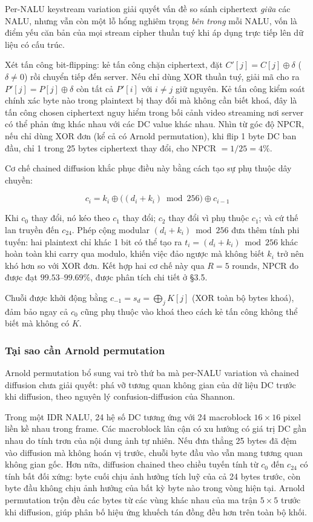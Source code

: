 Per-NALU keystream variation giải quyết vấn đề so sánh ciphertext \emph{giữa} các NALU, nhưng vẫn còn một lỗ hổng nghiêm trọng \emph{bên trong} mỗi NALU, vốn là điểm yếu căn bản của mọi stream cipher thuần tuý khi áp dụng trực tiếp lên dữ liệu có cấu trúc.

Xét tấn công bit-flipping: kẻ tấn công chặn ciphertext, đặt $C'[j] = C[j] \oplus \delta$ ($\delta \neq 0$) rồi chuyển tiếp đến server. Nếu chỉ dùng XOR thuần tuý, giải mã cho ra $P'[j] = P[j] \oplus \delta$ còn tất cả $P'[i]$ với $i \neq j$ giữ nguyên. Kẻ tấn công kiểm soát chính xác byte nào trong plaintext bị thay đổi mà không cần biết khoá, đây là tấn công chosen ciphertext nguy hiểm trong bối cảnh video streaming nơi server có thể phản ứng khác nhau với các DC value khác nhau. Nhìn từ góc độ NPCR, nếu chỉ dùng XOR đơn (kể cả có Arnold permutation), khi flip 1 byte DC ban đầu, chỉ 1 trong 25 bytes ciphertext thay đổi, cho NPCR $= 1/25 = 4\%$.

Cơ chế chained diffusion khắc phục điều này bằng cách tạo sự phụ thuộc dây chuyền:

\begin{equation}
c_i = k_i \oplus \bigl((d_i + k_i) \bmod 256\bigr) \oplus c_{i-1}
\end{equation}

Khi $c_0$ thay đổi, nó kéo theo $c_1$ thay đổi; $c_2$ thay đổi vì phụ thuộc $c_1$; và cứ thế lan truyền đến $c_{24}$. Phép cộng modular $(d_i + k_i) \bmod 256$ đưa thêm tính phi tuyến: hai plaintext chỉ khác 1 bit có thể tạo ra $t_i = (d_i + k_i) \bmod 256$ khác hoàn toàn khi carry qua modulo, khiến việc đảo ngược mà không biết $k_i$ trở nên khó hơn so với XOR đơn. Kết hợp hai cơ chế này qua $R = 5$ rounds, NPCR đo được đạt $99.53$--$99.69\%$, được phân tích chi tiết ở §3.5.

Chuỗi được khởi động bằng $c_{-1} = s_d = \bigoplus_j K[j]$ (XOR toàn bộ bytes khoá), đảm bảo ngay cả $c_0$ cũng phụ thuộc vào khoá theo cách kẻ tấn công không thể biết mà không có $K$.

\subsubsection{Tại sao cần Arnold permutation}

Arnold permutation bổ sung vai trò thứ ba mà per-NALU variation và chained diffusion chưa giải quyết: phá vỡ tương quan không gian của dữ liệu DC trước khi diffusion, theo nguyên lý confusion-diffusion của Shannon.

Trong một IDR NALU, 24 hệ số DC tương ứng với 24 macroblock $16\times16$ pixel liền kề nhau trong frame. Các macroblock lân cận có xu hướng có giá trị DC gần nhau do tính trơn của nội dung ảnh tự nhiên. Nếu đưa thẳng 25 bytes đã đệm vào diffusion mà không hoán vị trước, chuỗi byte đầu vào vẫn mang tương quan không gian gốc. Hơn nữa, diffusion chained theo chiều tuyến tính từ $c_0$ đến $c_{24}$ có tính bất đối xứng: byte cuối chịu ảnh hưởng tích luỹ của cả 24 bytes trước, còn byte đầu không chịu ảnh hưởng của bất kỳ byte nào trong vòng hiện tại. Arnold permutation trộn đều các bytes từ các vùng khác nhau của ma trận $5\times5$ trước khi diffusion, giúp phân bố hiệu ứng khuếch tán đồng đều hơn trên toàn bộ khối.

